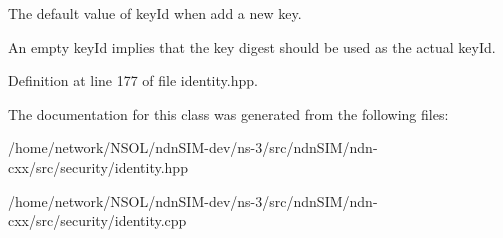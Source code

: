 The default value of key\+Id when add a new key. 

An empty key\+Id implies that the key digest should be used as the actual key\+Id. 

Definition at line 177 of file identity.\+hpp.



The documentation for this class was generated from the following files\+:\begin{DoxyCompactItemize}
\item 
/home/network/\+N\+S\+O\+L/ndn\+S\+I\+M-\/dev/ns-\/3/src/ndn\+S\+I\+M/ndn-\/cxx/src/security/identity.\+hpp\item 
/home/network/\+N\+S\+O\+L/ndn\+S\+I\+M-\/dev/ns-\/3/src/ndn\+S\+I\+M/ndn-\/cxx/src/security/identity.\+cpp\end{DoxyCompactItemize}
